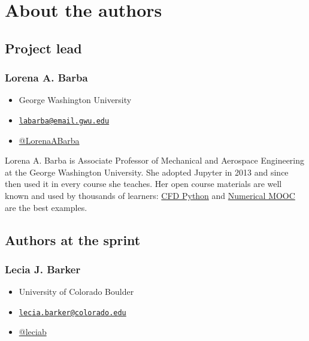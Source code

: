 \documentclass[]{book}
\providecommand{\tightlist}{%
  \setlength{\itemsep}{0pt}\setlength{\parskip}{0pt}}
\begin{document}
\hypertarget{authors}{%
\chapter{About the authors}\label{authors}}

\hypertarget{project-lead}{%
\section{Project lead}\label{project-lead}}

\hypertarget{lorena-a.-barba}{%
\subsection*{Lorena A. Barba}\label{lorena-a.-barba}}

\begin{itemize}
\tightlist
\item
  George Washington University
\item
  \href{mailto:labarba@email.gwu.edu}{\nolinkurl{labarba@email.gwu.edu}}
\item
  \href{https://twitter.com/LorenaABarba}{@LorenaABarba}
\end{itemize}

Lorena A. Barba is Associate Professor of Mechanical and Aerospace Engineering at the
George Washington University. She adopted Jupyter in 2013 and since then used it in
every course she teaches. Her open course materials are well known and used by
thousands of learners:
\href{http://lorenabarba.com/blog/cfd-python-12-steps-to-navier-stokes/}{CFD Python} and
\href{https://github.com/numerical-mooc/numerical-mooc}{Numerical MOOC} are the best examples.

\hypertarget{authors-at-the-sprint}{%
\section{Authors at the sprint}\label{authors-at-the-sprint}}

\hypertarget{lecia-j.-barker}{%
\subsection*{Lecia J. Barker}\label{lecia-j.-barker}}

\begin{itemize}
\tightlist
\item
  University of Colorado Boulder
\item
  \href{mailto:lecia.barker@colorado.edu}{\nolinkurl{lecia.barker@colorado.edu}}
\item
  \href{https://twitter.com/leciab}{@leciab}
\end{itemize}
\end{document}
